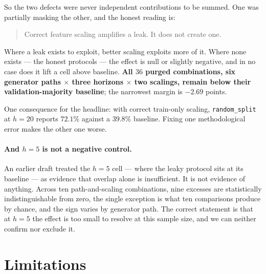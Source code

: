 \documentclass[11pt,a4paper]{article}
\begin{document}
So the two defects were never independent contributions to be summed. One was
partially masking the other, and the honest reading is:

\begin{quote}
Correct feature scaling amplifies a leak. It does not create one.
\end{quote}

Where a leak exists to exploit, better scaling exploits more of it. Where none
exists --- the honest protocols --- the effect is null or slightly negative, and
in no case does it lift a cell above baseline. \textbf{All $36$ purged
combinations, six generator paths $\times$ three horizons $\times$ two scalings,
remain below their validation-majority baseline}; the narrowest margin is
$-2.69$ points.

One consequence for the headline: with correct train-only scaling,
\texttt{random\_split} at $h{=}20$ reports $72.1\%$ against a $39.8\%$ baseline.
Fixing one methodological error makes the other one worse.

\paragraph{And $h{=}5$ is not a negative control.} An earlier draft treated the
$h{=}5$ cell --- where the leaky protocol sits at its baseline --- as evidence
that overlap alone is insufficient. It is not evidence of anything. Across ten
path-and-scaling combinations, nine excesses are statistically indistinguishable
from zero, the single exception is what ten comparisons produce by chance, and
the sign varies by generator path. The correct statement is that at $h{=}5$ the
effect is too small to resolve at this sample size, and we can neither confirm
nor exclude it.

\section{Limitations}
\label{sec:limits}
\end{document}
